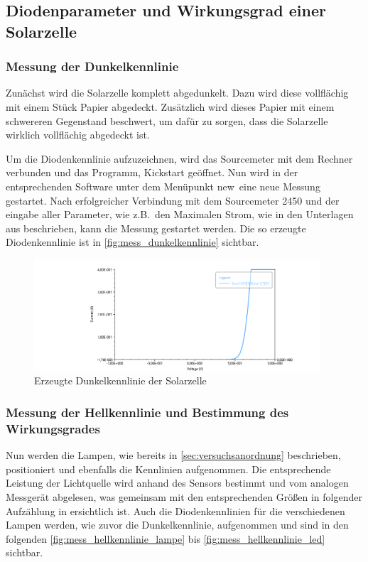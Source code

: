 \documentclass[12pt,english,ngerman]{scrartcl}
\begin{document}
\subsection{Diodenparameter und Wirkungsgrad einer Solarzelle}

\subsubsection{Messung der Dunkelkennlinie}

Zunächst wird die Solarzelle komplett abgedunkelt. Dazu wird diese vollflächig
mit einem Stück Papier abgedeckt. Zusätzlich wird dieses Papier mit einem
schwereren Gegenstand beschwert, um dafür zu sorgen, dass die Solarzelle
wirklich vollflächig abgedeckt ist.

Um die Diodenkennlinie aufzuzeichnen, wird das Sourcemeter mit dem Rechner
verbunden und das Programm, Kickstart geöffnet. Nun wird in der entsprechenden
Software unter dem Menüpunkt \dq new\dq \ eine neue Messung gestartet. Nach
erfolgreicher Verbindung mit dem Sourcemeter 2450 und der eingabe aller
Parameter, wie z.B.\ den Maximalen Strom, wie in den Unterlagen aus
\cite{knoll_solarzelle_nodate} beschrieben, kann die Messung gestartet werden.
Die so erzeugte Diodenkennlinie ist in \autoref{fig:mess_dunkelkennlinie}
sichtbar.

\begin{figure}[H]
	\centering
	\includegraphics[width=0.95\textwidth]{figures/dunekl.png}
	\caption{Erzeugte Dunkelkennlinie der Solarzelle
	}\label{fig:mess_dunkelkennlinie}
\end{figure}

\subsubsection{Messung der Hellkennlinie und Bestimmung des Wirkungsgrades}

Nun werden die Lampen, wie bereits in \autoref{sec:versuchsanordnung}
beschrieben, positioniert und ebenfalls die Kennlinien aufgenommen. Die
entsprechende Leistung der Lichtquelle wird anhand des Sensors bestimmt und vom
analogen Messgerät abgelesen, was gemeinsam mit den entsprechenden Größen in
folgender Aufzählung in  ersichtlich ist. Auch die
Diodenkennlinien für die verschiedenen Lampen werden, wie zuvor die
Dunkelkennlinie, aufgenommen und sind in den folgenden
\autoref{fig:mess_hellkennlinie_lampe} bis \autoref{fig:mess_hellkennlinie_led}
sichtbar.
\end{document}
